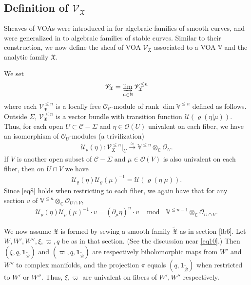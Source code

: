 \documentclass[11pt,b5paper,notitlepage]{article}
\theoremstyle{definition}
\theoremstyle{plain}
\newcommand{\fk}{\mathfrak}
\newcommand{\mc}{\mathcal}
\newcommand{\wtd}{\widetilde}
\newcommand{\id}{\mathbf{1}}
\newcommand{\scr}{\mathscr}
\newcommand{\Vbb}{\mathbb V}
\newcommand{\Cbb}{\mathbb C}
\newcommand{\Nbb}{\mathbb N}
\numberwithin{equation}{section}
\begin{document}
\subsection*{Definition of $\scr V_{\fk X}$}

Sheaves of VOAs were introduced in \cite{FB04} for algebraic families of smooth curves, and were generalized in \cite{DGT19a} to algebraic families of stable curves. Similar to their construction, we now define the sheaf of VOA $\scr V_{\fk X}$ associated to a VOA $\Vbb$ and the analytic family $\fk X$. 

We  \index{VX@$\scr V_{\fk X},\scr V_{\fk X}^{\leq n}$} set
\begin{align*}
\scr V_{\fk X}=\varinjlim_{n\in\Nbb}\scr V_{\fk X}^{\leq n}
\end{align*}
where each $\scr V_{\fk X}^{\leq n}$ is a locally free $\scr O_{\mc C}$-module of rank $\dim\Vbb^{\leq n}$ defined as follows. Outside $\Sigma$, $\scr V_{\fk X}^{\leq n}$ is a vector bundle with transition function $\mc U(\varrho(\eta|\mu))$. Thus, for each open $U\subset\mc C-\Sigma$ and $\eta\in\scr O(U)$ univalent on each fiber, we have an isomorphism of $\scr O_U$-modules \index{U@$\mc U_\varrho(\eta)$} (a trivilization) 
\begin{align}
\mc U_\varrho(\eta):\scr V_{\fk X}^{\leq n}|_U\xrightarrow{\simeq} \Vbb^{\leq n}\otimes_{\Cbb}\scr O_U.\label{eq35}
\end{align}
If $V$ is another open subset of $\mc C-\Sigma$ and $\mu\in\scr O(V)$ is also univalent on each fiber, then on $U\cap V$ we have
\begin{align}
\mc U_\varrho(\eta)\mc U_\varrho(\mu)^{-1}=\mc U(\varrho(\eta|\mu)).
\end{align}
Since \eqref{eq8} holds when restricting to each fiber, we again have that for any section $v$ of $\Vbb^{\leq n}\otimes_{\Cbb}\scr O_{U\cap V}$,
\begin{align}
\mc U_\varrho(\eta)\mc U_\varrho(\mu)^{-1}\cdot v=(\partial_\mu\eta)^n\cdot v~~\mod ~~\Vbb^{\leq n-1}\otimes_{\Cbb}\scr O_{U\cap V}.\label{eq25}
\end{align}


We now assume $\fk X$ is formed by sewing a smooth family $\wtd{\fk X}$ as in section \ref{lb6}. Let $W,W',W'',\xi,\varpi,q$ be as in that section. (See the discussion near \eqref{eq10}.) Then $(\xi,q,\id_{\wtd {\mc B}})$ and $(\varpi,q,\id_{\wtd{\mc B}})$ are respectively biholomorphic maps from $W'$ and $W''$ to complex manifolds, and the projection $\pi$ equals $(q,\id_{\wtd{\mc B}})$ when restricted to $W'$ or $W''$. Thus, $\xi,\varpi$ are univalent on fibers of $W',W''$ respectively.
\end{document}
